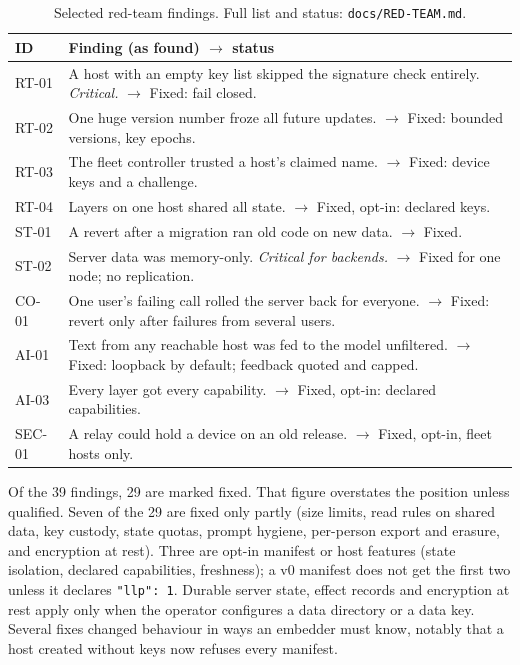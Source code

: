 \documentclass[10pt,twocolumn]{article}
\newcommand{\code}[1]{\texttt{#1}}
\begin{document}
\begin{table}[t]
\centering\footnotesize
\begin{tabularx}{\columnwidth}{@{}lX@{}}
\toprule
ID & Finding (as found) $\rightarrow$ status \\
\midrule
RT-01 & A host with an empty key list skipped the signature check entirely. \emph{Critical.}
$\rightarrow$ Fixed: fail closed. \\
RT-02 & One huge version number froze all future updates. $\rightarrow$ Fixed: bounded versions,
key epochs. \\
RT-03 & The fleet controller trusted a host's claimed name. $\rightarrow$ Fixed: device keys and
a challenge. \\
RT-04 & Layers on one host shared all state. $\rightarrow$ Fixed, opt-in: declared keys. \\
ST-01 & A revert after a migration ran old code on new data. $\rightarrow$ Fixed. \\
ST-02 & Server data was memory-only. \emph{Critical for backends.} $\rightarrow$ Fixed for one
node; no replication. \\
CO-01 & One user's failing call rolled the server back for everyone. $\rightarrow$ Fixed:
revert only after failures from several users. \\
AI-01 & Text from any reachable host was fed to the model unfiltered. $\rightarrow$ Fixed:
loopback by default; feedback quoted and capped. \\
AI-03 & Every layer got every capability. $\rightarrow$ Fixed, opt-in: declared capabilities. \\
SEC-01 & A relay could hold a device on an old release. $\rightarrow$ Fixed, opt-in, fleet hosts
only. \\
\bottomrule
\end{tabularx}
\caption{Selected red-team findings. Full list and status: \code{docs/RED-TEAM.md}.}
\label{tab:redteam}
\end{table}

Of the 39 findings, 29 are marked fixed. That figure overstates the position unless qualified.
Seven of the 29 are fixed only partly (size limits, read rules on shared data, key custody, state
quotas, prompt hygiene, per-person export and erasure, and encryption at rest). Three are opt-in
manifest or host features (state isolation, declared capabilities, freshness); a v0 manifest does
not get the first two unless it declares \code{"llp": 1}. Durable server state, effect records
and encryption at rest apply only when the operator configures a data directory or a data key. Several fixes changed behaviour in ways an
embedder must know, notably that a host created without keys now refuses every manifest.
\end{document}
